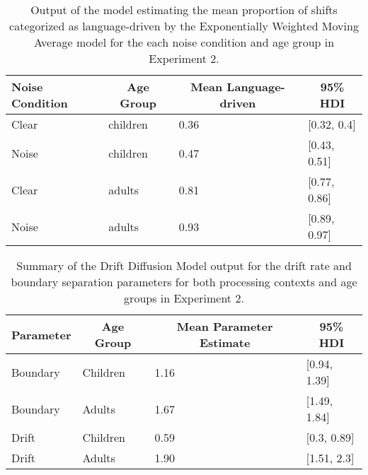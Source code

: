 \documentclass[,man,floatsintext]{apa6}
\begin{document}
\begin{appendix}
\begin{table}[h]
\begin{center}
\begin{threeparttable}
\caption{\label{tab:noise-guess-cuts}Output of the model estimating the mean proportion of shifts categorized as language-driven by the Exponentially Weighted Moving Average model for the each noise condition and age group in Experiment 2.}
\begin{tabular}{llll}
\toprule
Noise Condition & \multicolumn{1}{c}{Age Group} & \multicolumn{1}{c}{Mean Language-driven} & \multicolumn{1}{c}{95\% HDI}\\
\midrule
Clear & children & 0.36 & [0.32, 0.4]\\
Noise & children & 0.47 & [0.43, 0.51]\\
Clear & adults & 0.81 & [0.77, 0.86]\\
Noise & adults & 0.93 & [0.89, 0.97]\\
\bottomrule
\end{tabular}
\end{threeparttable}
\end{center}
\end{table}

\begin{table}[h]
\begin{center}
\begin{threeparttable}
\caption{\label{tab:noise-hddm}Summary of the Drift Diffusion Model output for the drift rate and boundary separation parameters for both processing contexts and age groups in Experiment 2.}
\begin{tabular}{llll}
\toprule
Parameter & \multicolumn{1}{c}{Age Group} & \multicolumn{1}{c}{Mean Parameter Estimate} & \multicolumn{1}{c}{95\% HDI}\\
\midrule
Boundary & Children & 1.16 & [0.94, 1.39]\\
Boundary & Adults & 1.67 & [1.49, 1.84]\\
Drift & Children & 0.59 & [0.3, 0.89]\\
Drift & Adults & 1.90 & [1.51, 2.3]\\
\bottomrule
\end{tabular}
\end{threeparttable}
\end{center}
\end{table}
\end{appendix}
\end{document}
